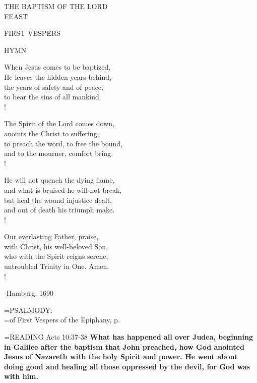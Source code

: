 \begin{center}\normalsize THE BAPTISM OF THE LORD\\
\footnotesize FEAST\\
\end{center}

\begin{flushleft}\normalsize FIRST VESPERS\\\end{flushleft}

\noindent\small{\uppercase{Hymn }}\normalsize\label{baptism:hymn}
\begin{cverse}
When Jesus comes to be baptized,\\
He leaves the hidden years behind,\\
the years of safety and of peace,\\
to bear the sins of all mankind.\\!

The Spirit of the Lord comes down,\\
anoints the Christ to suffering,\\
to preach the word, to free the bound,\\
and to the mourner, comfort bring.\\!

He will not quench the dying flame,\\
and what is bruised he will not break,\\
but heal the wound injustice dealt,\\
and out of death his triumph make.\\!

Our everlasting Father, praise,\\
with Christ, his well-beloved Son,\\
who with the Spirit reigns serene,\\
untroubled Trinity in One. Amen.\\!
\end{cverse}
\begin{flushright}\tiny -Hamburg, 1690\end{flushright}

\hangindent=\parindent \small{PSALMODY:}\\
\hangindent=\parindent  of First Vespers of the Epiphany, p. \pageref{epiphany:firstVespers}\vspace{0.5em}

\hangindent=\parindent \small{READING}   Acts 10:37-38 \textbf{  What has happened all over Judea, beginning in Galilee after the baptism that John preached, how God anointed Jesus of Nazareth with the holy Spirit and power. He went about doing good and healing all those oppressed by the devil, for God was with him.\\}


